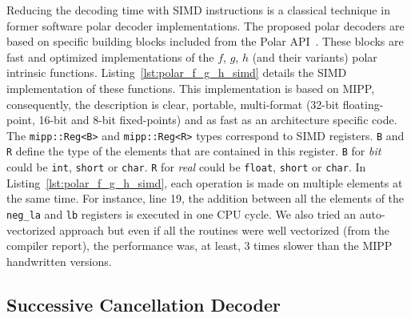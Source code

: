 Reducing the decoding time with SIMD instructions is a classical technique in
former software polar decoder implementations. The proposed polar decoders are
based on specific building blocks included from the Polar
API~\cite{Cassagne2015c,Cassagne2016b}. These blocks are fast and optimized
implementations of the $f$, $g$, $h$ (and their variants) polar intrinsic
functions. Listing~\ref{lst:polar_f_g_h_simd} details the SIMD implementation of
these functions. This implementation is based on MIPP, consequently, the
description is clear, portable, multi-format (32-bit floating-point, 16-bit and
8-bit fixed-points) and as fast as an architecture specific code. The
\verb|mipp::Reg<B>| and \verb|mipp::Reg<R>| types correspond to SIMD registers.
\verb|B| and \verb|R| define the type of the elements that are contained in this
register. \verb|B| for \textit{bit} could be \verb|int|, \verb|short| or
\verb|char|. \verb|R| for \textit{real} could be \verb|float|, \verb|short| or
\verb|char|. In Listing~\ref{lst:polar_f_g_h_simd}, each operation is made on
multiple elements at the same  time. For instance, line 19, the addition between
all the elements of the \verb|neg_la| and \verb|lb| registers is executed in one
CPU cycle. We also tried an auto-vectorized approach but even if all the
routines were well vectorized (from the compiler report), the performance was,
at least, 3 times slower than the MIPP handwritten versions.


\subsection{Successive Cancellation Decoder}

